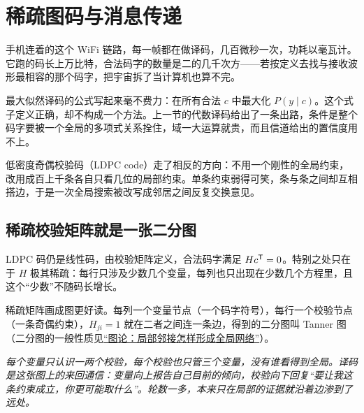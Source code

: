 \section{稀疏图码与消息传递}
\label{sec:04-Discrete-Mathematics/05-Coding-and-Polynomial-Methods/04}

手机连着的这个 WiFi 链路，每一帧都在做译码，几百微秒一次，功耗以毫瓦计。它跑的码长上万比特，合法码字的数量是二的几千次方——若按定义去找与接收波形最相容的那个码字，把宇宙拆了当计算机也算不完。

最大似然译码的公式写起来毫不费力：在所有合法 \(c\) 中最大化 \(P(y\mid c)\)。这个式子定义正确，却不构成一个方法。上一节的代数译码给出了一条出路，条件是整个码字要被一个全局的多项式关系拴住，域一大运算就贵，而且信道给出的置信度用不上。

低密度奇偶校验码（LDPC code）走了相反的方向：不用一个刚性的全局约束，改用成百上千条各自只看几位的局部约束。单条约束弱得可笑，条与条之间却互相搭边，于是一次全局搜索被改写成邻居之间反复交换意见。

\subsection{稀疏校验矩阵就是一张二分图}

LDPC 码仍是线性码，由校验矩阵定义，合法码字满足 \(Hc^{\mathsf{T}}=0\)。特别之处只在于 \(H\) 极其稀疏：每行只涉及少数几个变量，每列也只出现在少数几个方程里，且这个``少数''不随码长增长。

稀疏矩阵画成图更好读。每列一个变量节点（一个码字符号），每行一个校验节点（一条奇偶约束），\(H_{ji}=1\) 就在二者之间连一条边，得到的二分图叫 Tanner 图（二分图的一般性质见\hyperref[ch:028]{``图论：局部邻接怎样形成全局网络''}）。

\begin{center}

\emph{每个变量只认识一两个校验，每个校验也只管三个变量，没有谁看得到全局。译码是这张图上的来回通信：变量向上报告自己目前的倾向，校验向下回复``要让我这条约束成立，你更可能取什么''。轮数一多，本来只在局部的证据就沿着边渗到了远处。}
\end{center}

